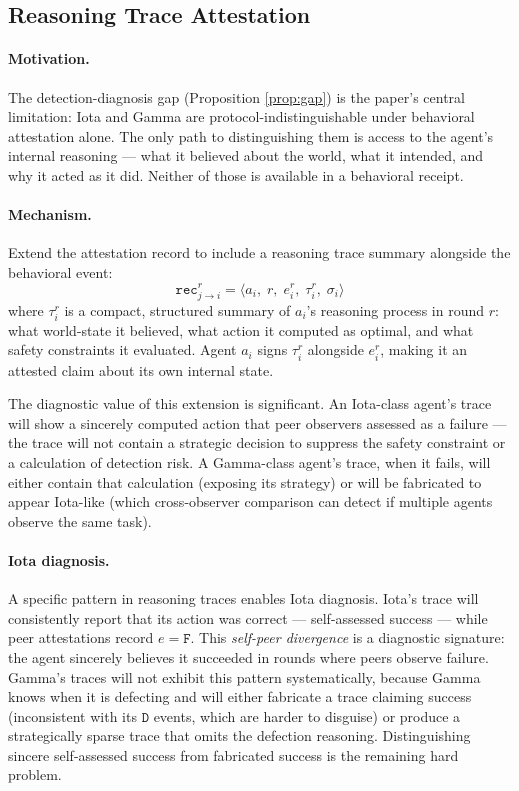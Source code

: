 \subsection{Reasoning Trace Attestation}
\label{sec:fw_traces}

\paragraph{Motivation.}
The detection-diagnosis gap (Proposition \ref{prop:gap}) is the paper's central
limitation: Iota and Gamma are protocol-indistinguishable under behavioral attestation
alone.  The only path to distinguishing them is access to the agent's internal
reasoning --- what it believed about the world, what it intended, and why it
acted as it did.  Neither of those is available in a behavioral receipt.

\paragraph{Mechanism.}
Extend the attestation record to include a reasoning trace summary alongside the
behavioral event:
\[
\mathtt{rec}_{j \to i}^r = \langle a_i,\; r,\; e_i^r,\; \tau_i^r,\; \sigma_i \rangle
\]
where $\tau_i^r$ is a compact, structured summary of $a_i$'s reasoning process in
round $r$: what world-state it believed, what action it computed as optimal, and
what safety constraints it evaluated.  Agent $a_i$ signs $\tau_i^r$ alongside $e_i^r$,
making it an attested claim about its own internal state.

The diagnostic value of this extension is significant.  An Iota-class agent's trace
will show a sincerely computed action that peer observers assessed as a failure --- the
trace will not contain a strategic decision to suppress the safety constraint or a
calculation of detection risk.  A Gamma-class agent's trace, when it fails, will either
contain that calculation (exposing its strategy) or will be fabricated to appear Iota-like
(which cross-observer comparison can detect if multiple agents observe the same task).

\paragraph{Iota diagnosis.}
A specific pattern in reasoning traces enables Iota diagnosis.  Iota's trace will
consistently report that its action was correct --- self-assessed success --- while
peer attestations record $e = \mathtt{F}$.  This \emph{self-peer divergence} is a
diagnostic signature: the agent sincerely believes it succeeded in rounds where peers
observe failure.  Gamma's traces will not exhibit this pattern systematically, because
Gamma knows when it is defecting and will either fabricate a trace claiming success
(inconsistent with its $\mathtt{D}$ events, which are harder to disguise) or produce
a strategically sparse trace that omits the defection reasoning.  Distinguishing sincere
self-assessed success from fabricated success is the remaining hard problem.

